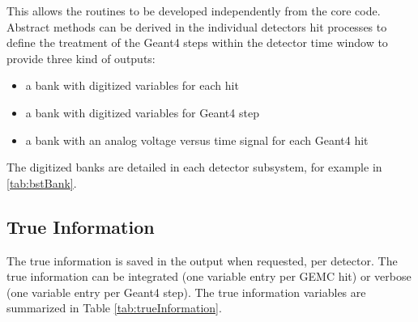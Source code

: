 This allows the routines to
be developed independently from the core code. Abstract methods can be derived in the individual detectors hit processes
to define the treatment of the Geant4 steps within the detector time window to provide three kind of outputs:

\begin{itemize}
	\item a bank with digitized variables for each hit
	\item a bank with digitized variables for Geant4 step
	\item a bank with an analog voltage versus time signal for each Geant4 hit
\end{itemize}

The digitized banks are detailed in each detector subsystem, for example in \ref{tab:bstBank}.

\subsection{True Information}

The true information is saved in the output when requested, per detector. The true information can
be integrated (one variable entry per GEMC hit) or verbose (one variable entry per Geant4 step).
The true information variables are summarized in Table \ref{tab:trueInformation}.

